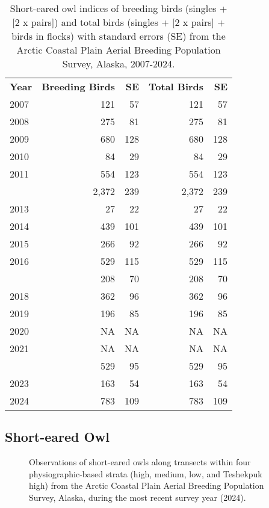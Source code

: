 \documentclass[
]{article}
\begin{document}
\begin{longtable}[t]{lrrrr}

\caption{\label{tbl-SEOW}Short-eared owl indices of breeding birds
(singles + {[}2 x pairs{]}) and total birds (singles + {[}2 x pairs{]} +
birds in flocks) with standard errors (SE) from the Arctic Coastal Plain
Aerial Breeding Population Survey, Alaska, 2007-2024.}

\tabularnewline

\\
\toprule
\textbf{Year} & \textbf{Breeding Birds} & \textbf{SE} & \textbf{Total Birds} & \textbf{SE}\\
\midrule
2007 & 121 & 57 & 121 & 57\\
2008 & 275 & 81 & 275 & 81\\
2009 & 680 & 128 & 680 & 128\\
2010 & 84 & 29 & 84 & 29\\
2011 & 554 & 123 & 554 & 123\\
\addlinespace
2012 & 2,372 & 239 & 2,372 & 239\\
2013 & 27 & 22 & 27 & 22\\
2014 & 439 & 101 & 439 & 101\\
2015 & 266 & 92 & 266 & 92\\
2016 & 529 & 115 & 529 & 115\\
\addlinespace
2017 & 208 & 70 & 208 & 70\\
2018 & 362 & 96 & 362 & 96\\
2019 & 196 & 85 & 196 & 85\\
2020 & NA & NA & NA & NA\\
2021 & NA & NA & NA & NA\\
\addlinespace
2022 & 529 & 95 & 529 & 95\\
2023 & 163 & 54 & 163 & 54\\
2024 & 783 & 109 & 783 & 109\\
\bottomrule

\end{longtable}

\endgroup{}

\newpage{}

\subsection*{Short-eared Owl}\label{short-eared-owl-2}

\begin{figure}


\caption{\label{fig-SEOWmap}Observations of short-eared owls along
transects within four physiographic-based strata (high, medium, low, and
Teshekpuk high) from the Arctic Coastal Plain Aerial Breeding Population
Survey, Alaska, during the most recent survey year (2024).}

\end{figure}%
\end{document}
